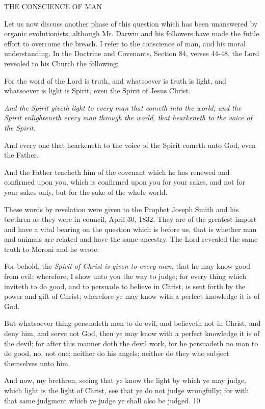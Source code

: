 THE CONSCIENCE OF MAN

Let us now discuss another phase of this question which has been unanswered by organic
evolutionists, although Mr. Darwin and his followers have made the futile effort to overcome
the breach. I refer to the conscience of man, and his moral understanding. In the Doctrine and
Covenants, Section 84, verses 44-48, the Lord revealed to his Church the following:

For the word of the Lord is truth, and whatsoever is truth is light, and whatsoever is light is
Spirit, even the Spirit of Jesus Christ.

\textit{And the Spirit giveth light to every man that cometh into the world; and the Spirit
enlighteneth every man through the world, that hearkeneth to the voice of the Spirit.}

And every one that hearkeneth to the voice of the Spirit cometh unto God, even the Father.

And the Father teacheth him of the covenant which he has renewed and confirmed upon you,
which is confirmed upon you for your sakes, and not for your sakes only, but for the sake of
the whole world.

These words by revelation were given to the Prophet Joseph Smith and his brethren as they
were in council, April 30, 1832. They are of the greatest import and have a vital bearing on
the question which is before us, that is whether man and animals are related and have the
same ancestry. The Lord revealed the same truth to Moroni and he wrote:

For behold, the \textit{Spirit of Christ is given to every man}, that he may know good from evil;
wherefore, I show unto you the way to judge; for every thing which inviteth to do good, and
to persuade to believe in Christ, is sent forth by the power and gift of Christ; wherefore ye
may know with a perfect knowledge it is of God.

But whatsoever thing persuadeth men to do evil, and believeth not in Christ, and deny him,
and serve not God, then ye may know with a perfect knowledge it is of the devil; for after
this manner doth the devil work, for he persuadeth no man to do good, no, not one; neither do
his angels; neither do they who subject themselves unto him.

And now, my brethren, seeing that ye know the light by which ye may judge, which light is
the light of Christ, see that ye do not judge wrongfully; for with that same judgment which ye
judge ye shall also be judged. 10

